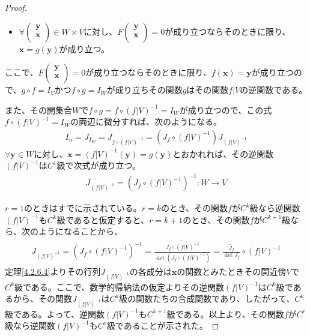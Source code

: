 \documentclass[dvipdfmx]{jsarticle}
\begin{document}
\begin{proof}
\begin{itemize}
\item
  $\forall\begin{pmatrix}
  \mathbf{y} \\
  \mathbf{x} \\
  \end{pmatrix} \in W \times V$に対し、$F\begin{pmatrix}
  \mathbf{y} \\
  \mathbf{x} \\
  \end{pmatrix} = 0$が成り立つならそのときに限り、$\mathbf{x} = g\left( \mathbf{y} \right)$が成り立つ。
\end{itemize}
ここで、$F\begin{pmatrix}
\mathbf{y} \\
\mathbf{x} \\
\end{pmatrix} = 0$が成り立つならそのときに限り、$f\left( \mathbf{x} \right) = \mathbf{y}$が成り立つので、$g \circ f = I_{V}$かつ$f \circ g = I_{W}$が成り立ちその関数$g$はその関数$f|V$の逆関数である。\par
また、その開集合$W$で$f \circ g = f \circ \left( f|V \right)^{- 1} = I_{W}$が成り立つので、この式$f \circ \left( f|V \right)^{- 1} = I_{W}$の両辺に微分すれば、次のようになる。
\begin{align*}
I_{n} = J_{I_{W}} = J_{f \circ \left( f|V \right)^{- 1}} = \left( J_{f} \circ \left( f|V \right)^{- 1} \right)J_{\left( f|V \right)^{- 1}}
\end{align*}
$\forall\mathbf{y} \in W$に対し、$\mathbf{x} = \left( f|V \right)^{- 1}\left( \mathbf{y} \right) = g\left( \mathbf{y} \right)$とおかれれば、その逆関数$\left( f|V \right)^{- 1}$は$C^{1}$級で次式が成り立つ。
\begin{align*}
J_{\left( f|V \right)^{- 1}} = \left( J_{f} \circ \left( f|V \right)^{- 1} \right)^{- 1}:W \rightarrow V
\end{align*}\par
$r = 1$のときはすでに示されている。$r = k$のとき、その関数$f$が$C^{k}$級なら逆関数$\left( f|V \right)^{- 1}$も$C^{k}$級であると仮定すると、$r = k + 1$のとき、その関数$f$が$C^{k + 1}$級なら、次のようになることから、
\begin{align*}
J_{\left( f|V \right)^{- 1}} = \left( J_{f} \circ \left( f|V \right)^{- 1} \right)^{- 1} = \frac{\widetilde{J_{f} \circ \left( f|V \right)^{- 1}}}{\det\left( J_{f} \circ \left( f|V \right)^{- 1} \right)} = \frac{\widetilde{J_{f}}}{\det J_{f}} \circ \left( f|V \right)^{- 1}
\end{align*}
定理\ref{4.2.6.4}よりその行列$J_{\left( f|V \right)^{- 1}}$の各成分は$\mathbf{x}$の関数とみたときその開近傍$V$で$C^{k}$級である。ここで、数学的帰納法の仮定よりその逆関数$\left( f|V \right)^{- 1}$は$C^{k}$級であるから、その関数$J_{\left( f|V \right)^{- 1}}$は$C^{k}$級の関数たちの合成関数であり、したがって、$C^{k}$級である。よって、逆関数$\left( f|V \right)^{- 1}$も$C^{k + 1}$級である。以上より、その関数$f$が$C^{r}$級なら逆関数$\left( f|V \right)^{- 1}$も$C^{r}$級であることが示された。
\end{proof}
\end{document}
